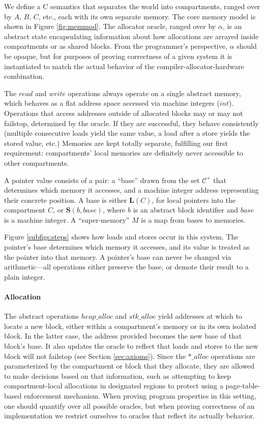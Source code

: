\documentclass{article}
\begin{document}
We define a C semantics that separates the world into compartments, ranged over by
\(A\), \(B\), \(C\), etc., each with its own separate memory. The core memory model
is shown in Figure \ref{fig:memmod}. The allocator oracle, ranged over by \(\alpha\),
is an abstract state encapsulating information about how allocations
are arrayed inside compartments or as shared blocks. From the programmer's
perspective, \(\alpha\) should be opaque, but for purposes of proving correctness
of a given system it is instantiated to match the actual behavior of the
compiler-allocator-hardware combination. 

The \(\mathit{read}\) and \(\mathit{write}\) operations always operate on a single
abstract memory, which behaves as a flat address space accessed via machine integers
(\(\mathit{int}\)). Operations that access addresses outside of allocated blocks
may or may not failstop, determined by the oracle. If they are successful, they
behave consistently (multiple consecutive loads yield the same value, a load after
a store yields the stored value, etc.) Memories are kept totally
separate, fulfilling our first requirement: compartments' local memories are
definitely never accessible to other compartments.

A pointer value consists of a pair: a ``base'' drawn from the set \(\mathcal{C}^+\)
that determines which memory it accesses, and a machine integer address representing
their concrete position. A base is either \(\mathbf{L}(C)\), for local pointers into
the compartment \(C\), or \(\mathbf{S}(b,\mathit{base})\), where \(b\) is an
abstract block identifier and \(\mathit{base}\) is a machine integer. A
``super-memory'' \(M\) is a map from bases to memories.

Figure \ref{subfigs:steps} shows how loads and stores occur in this system.
The pointer's base determines which memory it accesses, and its value is treated
as the pointer into that memory. A pointer's base can never be changed via
arithmetic---all operations either preserve the base, or demote their result
to a plain integer.

\paragraph{Allocation}

The abstract operations \(\mathit{heap\_alloc}\) and \(\mathit{stk\_alloc}\)
yield addresses at which to locate a new block, either within a compartment's memory
or in its own isolated block. In the latter case, the address provided becomes
the new base of that block's base. It also updates the oracle to reflect that loads
and stores to the new block will not failstop (see Section \ref{sec:axioms}). Since
the \(\mathit{*\_alloc}\) operations are parameterized by the compartment
or block that they allocate, they are allowed to make decisions based on that
information, such as attempting to keep compartment-local allocations in designated
regions to protect using a page-table-based enforcement mechanism. When proving
program properties in this setting, one should quantify over all possible oracles,
but when proving correctness of an implementation we restrict ourselves to oracles
that reflect its actually behavior.
\end{document}
